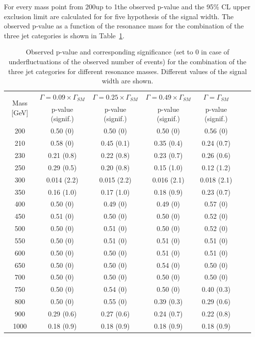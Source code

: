 For every mass point from 200\GeV up to 1\TeV the observed p-value and the 95\% CL upper exclusion limit are calculated for for five hypothesis of the signal width. The observed p-value as a function of the resonance mass for the combination of the three jet categories is shown in Table~\ref{tab:significance}.

\begin{table}[h!]
\begin{center}
\caption{Observed p-value and corresponding significance (set to 0 in case of underfluctuations of the observed number of events) for the combination of the three jet categories for different resonance masses. Different values of the signal width are shown.\label{tab:significance}}
\begin{tabular}{c|cccccc}
\toprule
\multirow{2}{*}{Mass [GeV]}            & $\Gamma = 0.09 \times \Gamma_{SM}$ & $\Gamma = 0.25 \times \Gamma_{SM}$ & $\Gamma = 0.49 \times \Gamma_{SM}$ & $\Gamma = \Gamma_{SM}$\\
                                          & p-value (signif.)  & p-value (signif.)  & p-value (signif.)  & p-value (signif.) \\
\midrule
200 &  0.50 (0)   & 0.50 (0)    & 0.50 (0) & 0.56 (0)\\
210 &  0.58 (0)   & 0.45 (0.1) & 0.35 (0.4) & 0.24 (0.7)\\
230 &  0.21 (0.8) & 0.22 (0.8) & 0.23 (0.7) & 0.26 (0.6)\\
250 &  0.29 (0.5) & 0.20 (0.8)  & 0.15 (1.0) & 0.12 (1.2)\\
300 &  0.014 (2.2)& 0.015 (2.2)& 0.016 (2.1) & 0.018 (2.1)\\
350 &  0.16 (1.0) & 0.17 (1.0) & 0.18 (0.9) & 0.23 (0.7)\\
400 &  0.50 (0)   & 0.49 (0)   & 0.49 (0) & 0.57 (0)\\
450 &  0.51 (0)   & 0.50 (0)   & 0.50 (0) & 0.52 (0)\\
500 &  0.50 (0)   & 0.51 (0)   & 0.50 (0) & 0.52 (0)\\
550 &  0.50 (0)   & 0.51 (0)   & 0.51 (0) & 0.51 (0)\\
600 &  0.50 (0)   & 0.50 (0)   & 0.51 (0) & 0.51 (0)\\
650 &  0.50 (0)   & 0.50 (0)   & 0.54 (0) & 0.50 (0)\\
700 &  0.50 (0)   & 0.50 (0)   & 0.50 (0) & 0.50 (0)\\
750 &  0.50 (0)   & 0.54 (0)   & 0.50 (0) & 0.40 (0.3)\\
800 &  0.50 (0)   & 0.55 (0)   & 0.39 (0.3) & 0.29 (0.6)\\
900 &  0.29 (0.6) & 0.27 (0.6) & 0.24 (0.7) & 0.22 (0.8)\\
1000 & 0.18 (0.9) & 0.18 (0.9) & 0.18 (0.9) & 0.18 (0.9)\\
\bottomrule
\end{tabular}
\end{center}
\end{table}

